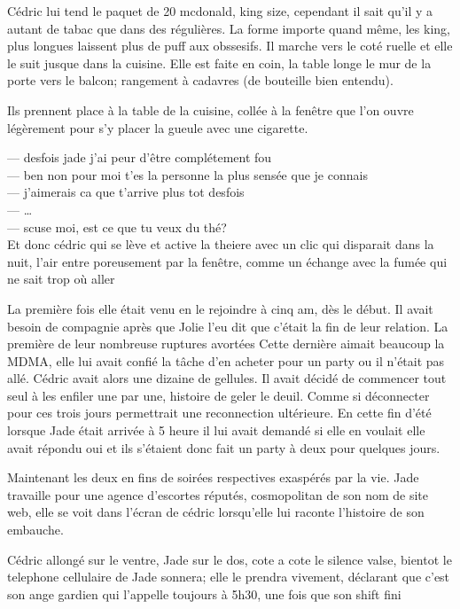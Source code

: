 \documentclass{article}
\begin{document}
Cédric lui tend le paquet de 20 mcdonald, king size, cependant il sait qu'il y a
autant de tabac que dans des régulières. La forme importe quand même, les king,
plus longues laissent plus de puff aux obssesifs. Il marche vers le coté ruelle et elle
le suit jusque dans la cuisine. Elle est faite en coin, la table longe le
mur de la porte vers le balcon; rangement à cadavres (de bouteille bien
entendu).

Ils prennent place à la table de la cuisine, collée à la fenêtre
que l'on ouvre légèrement pour s'y placer la gueule avec une cigarette.

--- desfois jade j'ai peur d'être complétement fou\\
--- ben non pour moi t'es la personne la plus sensée que je connais\\
--- j'aimerais ca que t'arrive plus tot desfois\\
--- \ldots\\
--- scuse moi, est ce que tu veux du thé?\\

Et donc cédric qui se lève et active la theiere avec un clic qui disparait
dans la nuit, l'air entre poreusement par la fenêtre, comme un échange
avec la fumée qui ne sait trop où aller

La première fois elle était venu en le rejoindre à cinq am, dès le
début. Il avait besoin de compagnie après que Jolie l'eu dit que c'était la fin
de leur relation. La première de leur nombreuse ruptures avortées Cette dernière
aimait beaucoup la MDMA, elle lui avait confié la tâche d'en acheter pour un
party ou il n'était pas allé. Cédric avait alors une dizaine de gellules. Il
avait décidé de commencer tout seul à les enfiler
une par une, histoire de geler le deuil. Comme si déconnecter pour ces trois
jours permettrait une reconnection ultérieure. En cette fin d'été lorsque Jade
était arrivée à 5 heure il lui avait demandé si elle en voulait elle avait
répondu oui et ils s'étaient donc fait un party à deux pour quelques jours.


Maintenant les deux en fins de soirées respectives exaspérés par la vie.
Jade travaille pour une agence d'escortes réputés, cosmopolitan de son
nom de site web, elle se voit dans l'écran de cédric lorsqu'elle lui raconte
l'histoire de son embauche.

\clearpage
Cédric allongé sur le ventre, Jade sur le dos, cote a cote le silence valse,
bientot le telephone cellulaire de Jade sonnera; elle le prendra vivement,
déclarant que c'est son ange gardien qui l'appelle toujours à 5h30, une fois que
son shift fini
\end{document}
